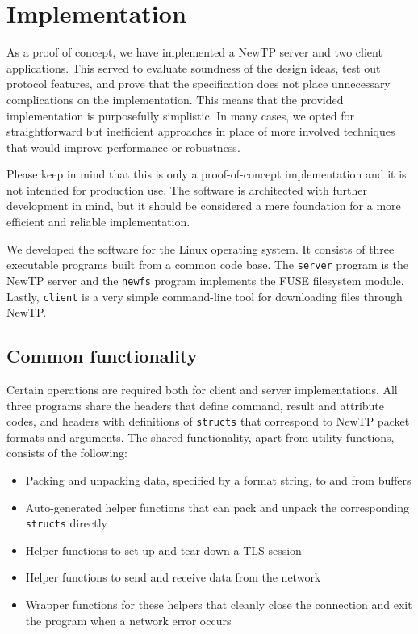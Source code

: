 
\chapter{Implementation}

As a proof of concept, we have implemented a NewTP server and two client applications. This served to evaluate
soundness of the design ideas, test out protocol features, and prove that the specification does not place
unnecessary complications on the implementation. This means that the provided implementation is purposefully
simplistic. In many cases, we opted for straightforward but inefficient approaches in place of more involved
techniques that would improve performance or robustness.

Please keep in mind that this is only a proof-of-concept implementation and it is not intended for production
use. The software is architected with further development in mind, but it should be considered a mere
foundation for a more efficient and reliable implementation.

We developed the software for the Linux operating system. It consists of three executable programs built from
a common code base. The {\tt server} program is the NewTP server and the {\tt newfs} program implements the
FUSE filesystem module. Lastly, {\tt client} is a very simple command-line tool for downloading files through
NewTP.

\section{Common functionality}

Certain operations are required both for client and server implementations. All three programs share the
headers that define command, result and attribute codes, and headers with definitions of {\tt structs} that
correspond to NewTP packet formats and arguments. The shared functionality, apart from utility functions,
consists of the following:
\begin{itemize}[nolistsep]
	\item Packing and unpacking data, specified by a format string, to and from buffers
	\item Auto-generated helper functions that can pack and unpack the corresponding {\tt structs}
		directly
	\item Helper functions to set up and tear down a TLS session
	\item Helper functions to send and receive data from the network
	\item Wrapper functions for these helpers that cleanly close the connection and exit the program
		when a network error occurs
\end{itemize}

